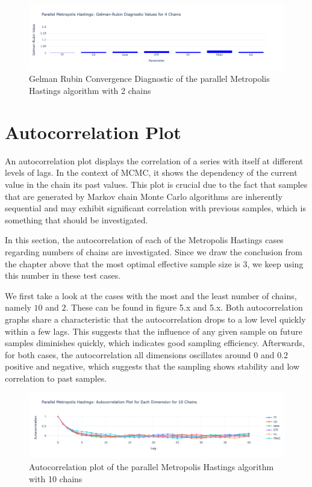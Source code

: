 \begin{figure}[H]
    \centering
    \includegraphics[width=1\textwidth]{figures/parallel_mh/GR_2.png}
    \captionsetup{width=.8\textwidth}
    \caption{Gelman Rubin Convergence Diagnostic of the parallel Metropolis Hastings algorithm with 2 chains}
    \label{fig:enter-label}
\end{figure}



\section{Autocorrelation Plot}
An autocorrelation plot displays the correlation of a series with itself at different levels of lags. In the context of MCMC, it shows the dependency of the current value in the chain its past values. This plot is crucial due to the fact that samples that are generated by Markov chain Monte Carlo algorithms are inherently sequential and may exhibit significant correlation with previous samples, which is something that should be investigated. 

In this section, the autocorrelation of each of the Metropolis Hastings cases regarding numbers of chains are investigated. Since we draw the conclusion from the chapter above that the most optimal effective sample size is $3$, we keep using this number in these test cases.

We first take a look at the cases with the most and the least number of chains, namely $10$ and $2$. These can be found in figure 5.x and 5.x. Both autocorrelation graphs share a characteristic that the autocorrelation drops to a low level quickly within a few lags. This suggests that the influence of any given sample on future samples diminishes quickly, which indicates good sampling efficiency. Afterwards, for both cases, the autocorrelation all dimensions oscillates around 0 and 0.2 positive and negative, which suggests that the sampling shows stability and low correlation to past samples. 

\begin{figure}[H]
    \centering
    \includegraphics[width=1\textwidth]{figures/parallel_mh/Autocorrelation_10.png}
    \captionsetup{width=.8\textwidth}
    \caption{Autocorrelation plot of the parallel Metropolis Hastings algorithm with 10 chains}
    \label{fig:enter-label}
\end{figure}


